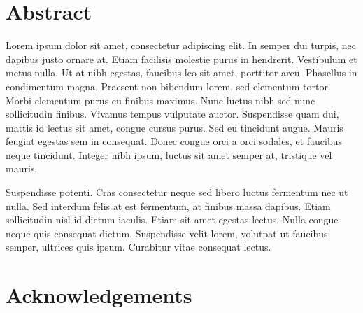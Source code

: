 \documentclass[a4paper,12pt]{report}
\newcommand{\linespacing}{2}
\renewcommand{\baselinestretch}{\linespacing}
\begin{document}
\chapter*{Abstract}
\renewcommand{\baselinestretch}{\linespacing}
\small\normalsize
Lorem ipsum dolor sit amet, consectetur adipiscing elit. In semper dui turpis, nec dapibus justo ornare at. Etiam facilisis molestie purus in hendrerit. Vestibulum et metus nulla. Ut at nibh egestas, faucibus leo sit amet, porttitor arcu. Phasellus in condimentum magna. Praesent non bibendum lorem, sed elementum tortor. Morbi elementum purus eu finibus maximus. Nunc luctus nibh sed nunc sollicitudin finibus. Vivamus tempus vulputate auctor. Suspendisse quam dui, mattis id lectus sit amet, congue cursus purus. Sed eu tincidunt augue. Mauris feugiat egestas sem in consequat. Donec congue orci a orci sodales, et faucibus neque tincidunt. Integer nibh ipsum, luctus sit amet semper at, tristique vel mauris.

Suspendisse potenti. Cras consectetur neque sed libero luctus fermentum nec ut nulla. Sed interdum felis at est fermentum, at finibus massa dapibus. Etiam sollicitudin nisl id dictum iaculis. Etiam sit amet egestas lectus. Nulla congue neque quis consequat dictum. Suspendisse velit lorem, volutpat ut faucibus semper, ultrices quis ipsum. Curabitur vitae consequat lectus.


\chapter*{Acknowledgements}
\renewcommand{\baselinestretch}{\linespacing}
\small\normalsize



\newpage
{}
\tableofcontents
\listoftables
{}
{}
\listoffigures
{}
{}


\newpage
{}

\end{document}
